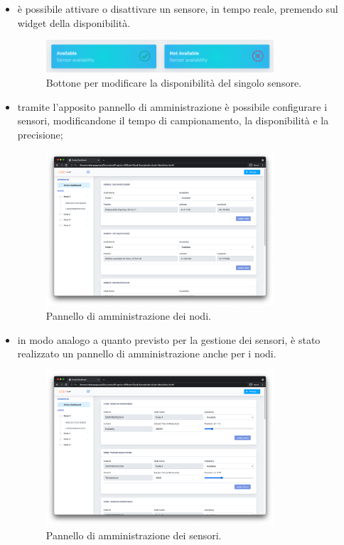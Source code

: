 \documentclass{article}
\begin{document}
\begin{itemize}
    \item è possibile attivare o disattivare un sensore, in tempo reale, premendo sul
widget della disponibilità.
\begin{figure}[H]
    \centering
     \includegraphics[width=0.80\textwidth]{change availability of sensor.png}
    \caption{Bottone per modificare la disponibilità del singolo sensore.}
    \label{fig:availability-button}
\end{figure}
\item tramite l’apposito pannello di amministrazione è possibile configurare i sensori, modificandone il tempo di campionamento, la disponibilità e la precisione;
\begin{figure}[H]
    \centering
     \includegraphics[width=0.80\textwidth]{nodes-management.png}
    \caption{Pannello di amministrazione dei nodi.}
    \label{fig:nodes-management}
\end{figure}
\item in modo analogo a quanto previsto per la gestione dei sensori, è stato realizzato un pannello di amministrazione anche per i nodi.
\begin{figure}[H]
    \centering
     \includegraphics[width=0.80\textwidth]{sensors-management.png}
    \caption{Pannello di amministrazione dei sensori.}
    \label{fig:sensor-management}
\end{figure}
\end{itemize}
\end{document}
